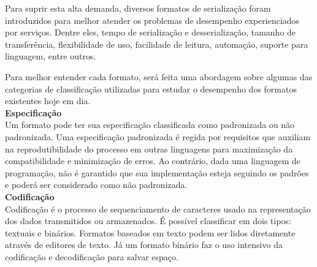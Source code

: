 Para suprir esta alta demanda, diversos formatos de serialização foram introduzidos para melhor atender os problemas de desempenho experienciados por serviços. Dentre eles, tempo de serialização e desserialização, tamanho de transferência, flexibilidade de uso, facilidade de leitura, automação, suporte para linguagem, entre outros. \cite{Guller2016}

\begin{table}[ht!]
  \centering
  \caption{Comparação de formatos de serialização}
\end{table}

Para melhor entender cada formato, será feita uma abordagem sobre algumas das categorias de classificação utilizadas para estudar o desempenho dos formatos existentes hoje em dia. \\

\textbf{Especificação} \\

Um formato pode ter sua especificação classificada como padronizada ou não padronizada. Uma especificação padronizada é regida por requisitos que auxiliam na reprodutibilidade do processo em outras linguagens para maximização da compatibilidade e minimização de erros. Ao contrário, dada uma linguagem de programação, não é garantido que sua implementação esteja seguindo os padrões e poderá ser considerado como não padronizada. \cite{McDermid1991} \\

\textbf{Codificação} \\

Codificação é o processo de sequenciamento de caracteres usado na representação dos dados transmitidos ou armazenados. É possível classificar em dois tipos: textuais e binários. Formatos baseados em texto podem ser lidos diretamente através de editores de texto. Já um formato binário faz o uso intensivo da codificação e decodificação para salvar espaço. \cite{Queiros2014} \\

